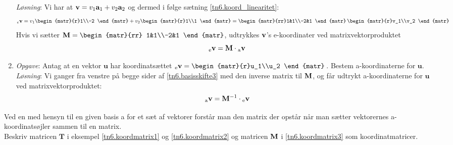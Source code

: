 \begin{example}
\begin{enumerate}
\textit{Løsning}: Vi har at $\mathbf{v}=v_1\mathbf{a}_1+v_2\mathbf{a}_2$ og dermed i følge sætning \ref{tn6.koord_linearitet}:
$$ 
{_\mathrm{e}\mathbf{v}}=v_1\begin{matr}{r}1\\-2 \end{matr}
+v_2\begin{matr}{r}1\\1 \end{matr} = \begin{matr}{rr}1&1\\-2&1 \end{matr}\,
\begin{matr}{r}v_1\\v_2 \end{matr}
$$
Hvis vi sætter $\mM=\begin{matr}{rr} 1&1\\-2&1 \end{matr}$, udtrykkes $\mathbf{v}$'s e-koordinater ved matrixvektorproduktet
\begin{equation}
{_\mathrm{e}\mathbf{v}}=\mathbf{M} \cdot {_\mathrm{a}\mathbf{v}}\label{tn6.basisskifte3}
\end{equation}
\item
\textit{Opgave}: Antag at en vektor $\mathbf u$ har koordinatsættet ${_\mathrm{e}\mathbf{v}}=\begin{matr}{r}u_1\\u_2 \end{matr}$\,. Bestem a-koordinaterne for $\mathbf u$.\\

\textit{Løsning}: Vi ganger fra venstre på begge sider af \ref{tn6.basisskifte3} med den inverse matrix til $\mathbf{M}$, og får udtrykt a-koordinaterne for $\mathbf u$ ved matrixvektorproduktet:
\begin{equation}
{_\mathrm{a}\mathbf{v}}=\mathbf{M}^{-1}\cdot {_\mathrm{e}\mathbf{v}}\label{tn6.basisskifte4}
\end{equation}
\end{enumerate}
\end{example}
\begin{exercise}\label{tn6.koordmatrix4}
Ved en  med hensyn til en given basis a for et sæt af vektorer forstår man den matrix der opstår når man sætter vektorernes a-koordinatsøjler sammen til en matrix.\\
Beskriv matricen $\mathbf T$ i eksempel \ref{tn6.koordmatrix1} og \ref{tn6.koordmatrix2} og matricen $\mathbf{M}$ i \ref{tn6.koordmatrix3} som koordinatmatricer. 
 
\end{exercise}
%
